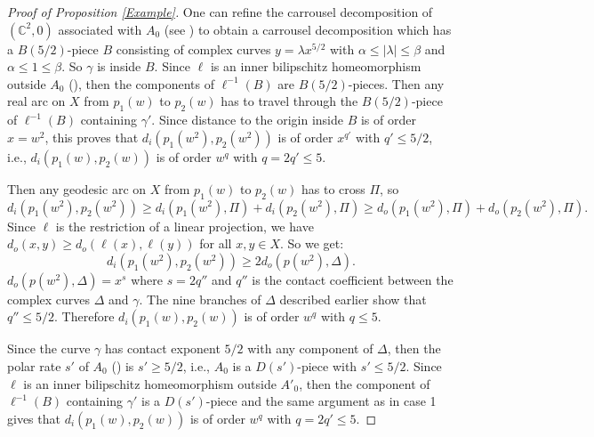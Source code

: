 \documentclass{amsart}
\begin{document}
\begin{proof} [Proof of Proposition \ref{Example}]
 One can
refine the carrousel decomposition of $(\mathbb C^2,0)$ associated with $A_0$
(see \cite[Section 12]{BNP}) to obtain a carrousel decomposition which
has a $B(5/2)$-piece $B$ consisting of complex curves
$y= \lambda x^{5/2}$ with $\alpha \leq |\lambda| \leq \beta$ and
$ \alpha \leq 1 \leq \beta$. So $\gamma$ is inside $B$. Since $\ell$
is an inner bilipschitz homeomorphism outside $A_0$
(\cite[Proposition 3.4]{BNP}), then the components of $\ell^{-1}(B)$ are
$B(5/2)$-pieces. Then any real arc on $X$ from $p_1(w)$ to $p_2(w)$
has to travel through the $B(5/2)$-piece of $\ell^{-1}(B)$ containing
$\gamma'$.  Since distance to the origin inside $B$ is of order
$x=w^2$, this proves that $d_i(p_1(w^2), p_2(w^2))$ is of order
$x^{q'}$ with $q' \leq 5/2$, i.e., $d_i(p_1(w), p_2(w))$ is of order
$w^q$ with $q=2q' \leq 5$.

 Then any geodesic arc on $X$ from
$p_1(w)$ to $p_2(w)$ has to cross $\Pi$, so
$$d_i(p_1(w^2), p_2(w^2)) \geq d_i(p_1(w^2), \Pi) + d_i(p_2(w^2), \Pi)
\geq d_o(p_1(w^2), \Pi) + d_o(p_2(w^2), \Pi).$$ Since $\ell$ is the
restriction of a linear projection, we have
$d_o(x,y) \geq d_o(\ell(x),\ell(y))$ for all $x,y \in X$. So we get:
$$d_i(p_1(w^2), p_2(w^2)) \geq 2 d_o(p(w^2), \Delta).$$
$d_o(p(w^2), \Delta) = x^{s}$ where $s=2q''$ and $q''$ is the contact
coefficient between the complex curves $\Delta$ and $\gamma$. The nine branches of $\Delta$ described earlier
show that   $q'' \leq 5/2$. Therefore  $d_i(p_1(w), p_2(w))$ is of order $w^q$ with $q  \leq 5$. 
 
  Since the curve $\gamma$ has
 contact exponent $5/2$ with any component of $\Delta$, then the polar
 rate $s'$ of $A_0$ (\cite[Proposition 3.4]{BNP}) is $s'\geq 5/2$,
 i.e., $A_0$ is a $D(s')$-piece with $s' \leq 5/2$.  Since $\ell$ is
 an inner bilipschitz homeomorphism outside $A'_0$, then the component
 of $\ell^{-1}(B)$ containing $\gamma'$ is a $D(s')$-piece and the
 same argument as in case 1 gives that $d_i(p_1(w), p_2(w))$ is of
 order $w^q$ with $q=2q' \leq 5$.
\end{proof}
\end{document}
